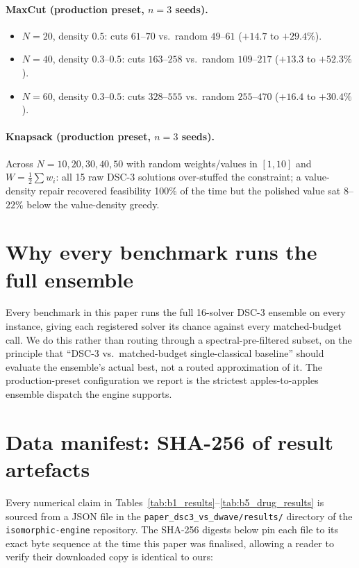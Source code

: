 \documentclass[11pt,a4paper]{article}
\begin{document}
\paragraph{MaxCut (production preset, $n=3$ seeds).}
\begin{itemize}
\item $N=20$, density $0.5$: cuts $61$--$70$ vs.\ random $49$--$61$
  ($+14.7$ to $+29.4\%$).
\item $N=40$, density $0.3$--$0.5$: cuts $163$--$258$ vs.\ random
  $109$--$217$ ($+13.3$ to $+52.3\%$).
\item $N=60$, density $0.3$--$0.5$: cuts $328$--$555$ vs.\ random
  $255$--$470$ ($+16.4$ to $+30.4\%$).
\end{itemize}

\paragraph{Knapsack (production preset, $n=3$ seeds).}
Across $N=10,20,30,40,50$ with random weights/values in $[1,10]$ and
$W=\frac12\sum w_i$: all 15 raw DSC-3 solutions over-stuffed the
constraint; a value-density repair recovered feasibility 100\% of the
time but the polished value sat $8$--$22\%$ below the value-density
greedy.

\section{Why every benchmark runs the full ensemble}
\label{appx:routing}

Every benchmark in this paper runs the full 16-solver DSC-3 ensemble on
every instance, giving each registered solver its chance against every
matched-budget call. We do this rather than routing through a
spectral-pre-filtered subset, on the principle that ``DSC-3 vs.\
matched-budget single-classical baseline'' should evaluate the
ensemble's actual best, not a routed approximation of it. The
production-preset configuration we report is the strictest
apples-to-apples ensemble dispatch the engine supports.

\section{Data manifest: SHA-256 of result artefacts}
\label{appx:data_manifest}

Every numerical claim in Tables~\ref{tab:b1_results}--\ref{tab:b5_drug_results}
is sourced from a JSON file in the
\texttt{paper\_dsc3\_vs\_dwave/results/} directory of the
\texttt{isomorphic-engine} repository. The SHA-256 digests below pin
each file to its exact byte sequence at the time this paper was
finalised, allowing a reader to verify their downloaded copy is
identical to ours:
\end{document}
